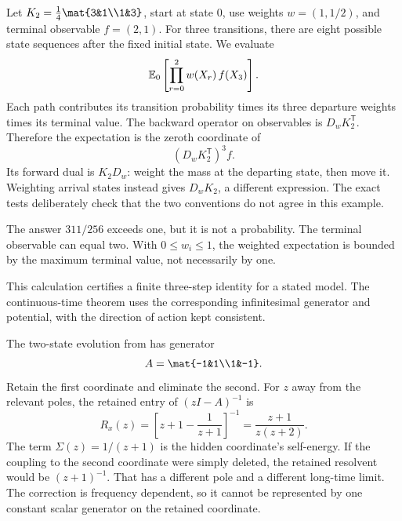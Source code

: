 Let $K_2=\frac14\mat{3&1\\1&3}$, start at state $0$, use weights $w=(1,1/2)$, and terminal observable $f=(2,1)$. For three transitions, there are eight possible state sequences after the fixed initial state. We evaluate
\[
\EE_0\left[\prod_{r=0}^{2}w(X_r)\,f(X_3)\right].
\]
Each path contributes its transition probability times its three departure weights times its terminal value.
The backward operator on observables is $D_w K_2^{\mathsf T}$. Therefore the expectation is the zeroth coordinate of
\[
(D_wK_2^{\mathsf T})^3f.
\]
Its forward dual is $K_2D_w$: weight the mass at the departing state, then move it. Weighting arrival states instead gives $D_wK_2$, a different expression. The exact tests deliberately check that the two conventions do not agree in this example.

The answer $311/256$ exceeds one, but it is not a probability. The terminal observable can equal two. With $0\le w_i\le1$, the weighted expectation is bounded by the maximum terminal value, not necessarily by one.

This calculation certifies a finite three-step identity for a stated model. The continuous-time theorem uses the corresponding infinitesimal generator and potential, with the direction of action kept consistent.

The two-state evolution from  has generator
\[
A=\mat{-1&1\\1&-1}.
\]
Retain the first coordinate and eliminate the second. For $z$ away from the relevant poles, the retained entry of $(zI-A)^{-1}$ is
\[
R_x(z)=\left[z+1-\frac1{z+1}\right]^{-1}
=\frac{z+1}{z(z+2)}.
\]
The term $\Sigma(z)=1/(z+1)$ is the hidden coordinate's self-energy.
If the coupling to the second coordinate were simply deleted, the retained resolvent would be $(z+1)^{-1}$. That has a different pole and a different long-time limit. The correction is frequency dependent, so it cannot be represented by one constant scalar generator on the retained coordinate.

